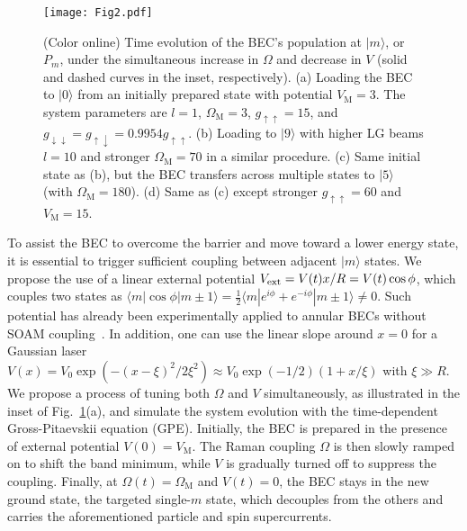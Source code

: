 \documentclass[twocolumn,prl,floatfix,citeautoscript,nofootinbib]{revtex4-1}
\begin{document}
\begin{figure}[t]
\centering
\texttt{[image: Fig2.pdf]}
\caption{(Color online) Time evolution of the BEC's population at $|m\rangle
$, or $P_{m}$, under the simultaneous increase in $\Omega $ and decrease in $%
V$ (solid and dashed curves in the inset, respectively). (a) Loading the BEC
to $|0\rangle $ from an initially prepared state with potential $V_{\mathrm{M%
}}=3$. The system parameters are $l=1$, $\Omega _{\mathrm{M}}=3$, $%
g_{\uparrow \uparrow }=15$, and $g_{\downarrow \downarrow }=g_{\uparrow
\downarrow }=0.9954g_{\uparrow \uparrow }$. (b) Loading to $|9\rangle $ with
higher LG beams $l=10$ and stronger $\Omega _{\mathrm{M}}=70$ in a similar
procedure. (c) Same initial state as (b), but the BEC transfers across
multiple states to $|5\rangle $ (with $\Omega _{\mathrm{M}}=180$). (d) Same
as (c) except stronger $g_{\uparrow \uparrow }=60$ and $V_{\mathrm{M}}=15$.}
\label{fig2}
\end{figure}

To assist the BEC to overcome the barrier and move toward a lower energy
state, it is essential to trigger sufficient coupling between adjacent $%
|m\rangle $ states. We propose the use of a linear external potential $V_{%
\mathrm{ext}}=V(t)x/R=V(t)\cos \phi $, which couples two states as $\langle
m|\cos \phi |m\pm 1\rangle =\frac{1}{2}\langle m|e^{i\phi }+e^{-i\phi }|m\pm
1\rangle \neq 0$. Such potential has already been experimentally applied to
annular BECs without SOAM coupling~\cite{Kumar2016}. In addition, one can
use the linear slope around $x=0$ for a Gaussian laser $V\left( x\right)
=V_{0}\exp \left( -(x-\xi )^{2}/2\xi ^{2}\right) \approx V_{0}\exp \left(
-1/2\right) \left( 1+x/\xi \right) $ with $\xi \gg R$. We propose a process
of tuning both $\Omega $ and $V$ simultaneously, as illustrated in the inset
of Fig.~\ref{fig2}(a), and simulate the system evolution with the
time-dependent Gross-Pitaevskii equation (GPE). Initially, the BEC is
prepared in the presence of external potential $V(0)=V_{\mathrm{M}}$. The
Raman coupling $\Omega $ is then slowly ramped on to shift the band minimum,
while $V$ is gradually turned off to suppress the coupling. Finally, at $%
\Omega (t)=\Omega _{\mathrm{M}}$ and $V(t)=0$, the BEC stays in the new
ground state, the targeted single-$m$ state, which decouples from the others
and carries the aforementioned particle and spin supercurrents.
\end{document}
